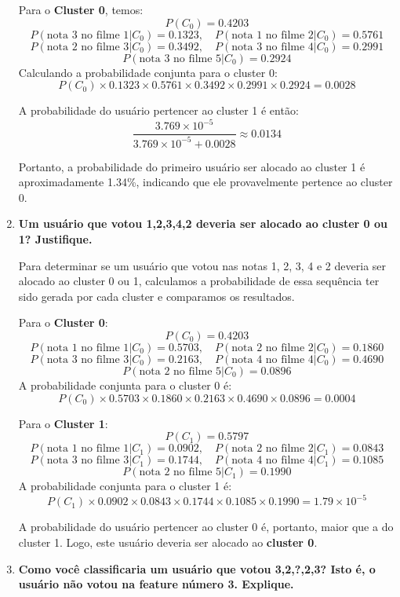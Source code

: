 \begin{enumerate}[label=(\alph*)]
    Para o \textbf{Cluster 0}, temos:
    \[
    P(C_0) = 0.4203
    \]
    \[
    P(\text{nota 3 no filme 1}|C_0) = 0.1323, \quad P(\text{nota 1 no filme 2}|C_0) = 0.5761
    \]
    \[
    P(\text{nota 2 no filme 3}|C_0) = 0.3492, \quad P(\text{nota 3 no filme 4}|C_0) = 0.2991
    \]
    \[
    P(\text{nota 3 no filme 5}|C_0) = 0.2924
    \]
    Calculando a probabilidade conjunta para o cluster 0:
    \[
    P(C_0) \times 0.1323 \times 0.5761 \times 0.3492 \times 0.2991 \times 0.2924 = 0.0028
    \]
    
    A probabilidade do usuário pertencer ao cluster 1 é então:
    \[
    \frac{3.769 \times 10^{-5}}{3.769 \times 10^{-5} + 0.0028} \approx 0.0134
    \]
    
    Portanto, a probabilidade do primeiro usuário ser alocado ao cluster 1 é aproximadamente 1.34\%, indicando que ele provavelmente pertence ao cluster 0.
    
    \item \textbf{Um usuário que votou 1,2,3,4,2 deveria ser alocado ao cluster 0 ou 1? Justifique.}
    
    Para determinar se um usuário que votou nas notas 1, 2, 3, 4 e 2 deveria ser alocado ao cluster 0 ou 1, calculamos a probabilidade de essa sequência ter sido gerada por cada cluster e comparamos os resultados.

Para o \textbf{Cluster 0}:
\[
P(C_0) = 0.4203
\]
\[
P(\text{nota 1 no filme 1}|C_0) = 0.5703, \quad P(\text{nota 2 no filme 2}|C_0) = 0.1860
\]
\[
P(\text{nota 3 no filme 3}|C_0) = 0.2163, \quad P(\text{nota 4 no filme 4}|C_0) = 0.4690
\]
\[
P(\text{nota 2 no filme 5}|C_0) = 0.0896
\]
A probabilidade conjunta para o cluster 0 é:
\[
P(C_0) \times 0.5703 \times 0.1860 \times 0.2163 \times 0.4690 \times 0.0896 = 0.0004
\]

Para o \textbf{Cluster 1}:
\[
P(C_1) = 0.5797
\]
\[
P(\text{nota 1 no filme 1}|C_1) = 0.0902, \quad P(\text{nota 2 no filme 2}|C_1) = 0.0843
\]
\[
P(\text{nota 3 no filme 3}|C_1) = 0.1744, \quad P(\text{nota 4 no filme 4}|C_1) = 0.1085
\]
\[
P(\text{nota 2 no filme 5}|C_1) = 0.1990
\]
A probabilidade conjunta para o cluster 1 é:
\[
P(C_1) \times 0.0902 \times 0.0843 \times 0.1744 \times 0.1085 \times 0.1990 = 1.79 \times 10^{-5}
\]

A probabilidade do usuário pertencer ao cluster 0 é, portanto, maior que a do cluster 1. Logo, este usuário deveria ser alocado ao \textbf{cluster 0}.

    \item \textbf{Como você classificaria um usuário que votou 3,2,?,2,3? Isto é, o usuário não votou na feature número 3. Explique.}
    

\end{enumerate}
